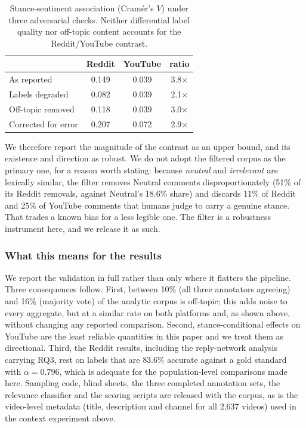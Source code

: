 \documentclass[pdflatex,sn-basic,Numbered,iicol]{sn-jnl}
\begin{document}
\begin{table}[t]
  \centering
  \small
  \caption{Stance-sentiment association (Cram\'er's $V$) under three adversarial
  checks. Neither differential label quality nor off-topic content accounts for the
  Reddit/YouTube contrast.}
  \label{tab:robust}
  \setlength{\tabcolsep}{4pt}
  \begin{tabular}{@{}lccc@{}}
    \toprule
    & Reddit & YouTube & ratio \\
    \midrule
    As reported            & 0.149 & 0.039 & 3.8$\times$ \\
    Labels degraded        & 0.082 & 0.039 & 2.1$\times$ \\
    Off-topic removed      & 0.118 & 0.039 & 3.0$\times$ \\
    Corrected for error    & 0.207 & 0.072 & 2.9$\times$ \\
    \bottomrule
  \end{tabular}
\end{table}

We therefore report the magnitude of the contrast as an upper bound, and its
existence and direction as robust. We do not adopt the filtered corpus as the
primary one, for a reason worth stating: because \emph{neutral} and
\emph{irrelevant} are lexically similar, the filter removes Neutral comments
disproportionately (51\% of its Reddit removals, against Neutral's 18.6\% share)
and discards 11\% of Reddit and 25\% of YouTube comments that humans judge to carry
a genuine stance. That trades a known bias for a less legible one. The filter is a
robustness instrument here, and we release it as such.

\subsubsection{What this means for the results}
We report the validation in full rather than only where it flatters the pipeline.
Three consequences follow. First, between 10\% (all three annotators agreeing) and
16\% (majority vote) of the analytic corpus is off-topic; this adds noise to every
aggregate, but at a similar rate on both platforms and, as shown above, without
changing any reported comparison. Second, stance-conditional effects on YouTube are
the least reliable quantities in this paper and we treat them as directional.
Third, the Reddit results, including the reply-network analysis carrying RQ3, rest
on labels that are $83.6\%$ accurate against a gold standard with $\alpha = 0.796$,
which is adequate for the population-level comparisons made here. Sampling code,
blind sheets, the three completed annotation sets, the relevance classifier and the
scoring scripts are released with the corpus, as is the video-level metadata (title, description and channel for all 2{,}637 videos) used in the context experiment above.
\end{document}
